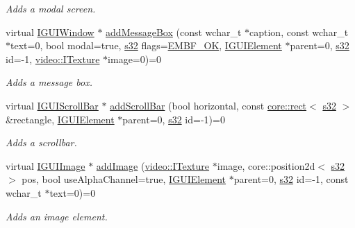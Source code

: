 \begin{DoxyCompactItemize}
\begin{DoxyCompactList}\small\item\em Adds a modal screen. \end{DoxyCompactList}\item 
virtual \hyperlink{classirr_1_1gui_1_1IGUIWindow}{I\+G\+U\+I\+Window} $\ast$ \hyperlink{classirr_1_1gui_1_1IGUIEnvironment_aaf8cad4624c26895523b22728098a917}{add\+Message\+Box} (const wchar\+\_\+t $\ast$caption, const wchar\+\_\+t $\ast$text=0, bool modal=true, \hyperlink{namespaceirr_ac66849b7a6ed16e30ebede579f9b47c6}{s32} flags=\hyperlink{namespaceirr_1_1gui_af55112e55731c9ad1b9fe9b372c521afa9660280349027f678b2315a15a23ba0e}{E\+M\+B\+F\+\_\+\+OK}, \hyperlink{classirr_1_1gui_1_1IGUIElement}{I\+G\+U\+I\+Element} $\ast$parent=0, \hyperlink{namespaceirr_ac66849b7a6ed16e30ebede579f9b47c6}{s32} id=-\/1, \hyperlink{classirr_1_1video_1_1ITexture}{video\+::\+I\+Texture} $\ast$image=0)=0
\begin{DoxyCompactList}\small\item\em Adds a message box. \end{DoxyCompactList}\item 
virtual \hyperlink{classirr_1_1gui_1_1IGUIScrollBar}{I\+G\+U\+I\+Scroll\+Bar} $\ast$ \hyperlink{classirr_1_1gui_1_1IGUIEnvironment_aff82c4b3935eaf56ce638996f5e002c9}{add\+Scroll\+Bar} (bool horizontal, const \hyperlink{classirr_1_1core_1_1rect}{core\+::rect}$<$ \hyperlink{namespaceirr_ac66849b7a6ed16e30ebede579f9b47c6}{s32} $>$ \&rectangle, \hyperlink{classirr_1_1gui_1_1IGUIElement}{I\+G\+U\+I\+Element} $\ast$parent=0, \hyperlink{namespaceirr_ac66849b7a6ed16e30ebede579f9b47c6}{s32} id=-\/1)=0
\begin{DoxyCompactList}\small\item\em Adds a scrollbar. \end{DoxyCompactList}\item 
virtual \hyperlink{classirr_1_1gui_1_1IGUIImage}{I\+G\+U\+I\+Image} $\ast$ \hyperlink{classirr_1_1gui_1_1IGUIEnvironment_a35cc257b3a183551a2ed0376dcec9fe4}{add\+Image} (\hyperlink{classirr_1_1video_1_1ITexture}{video\+::\+I\+Texture} $\ast$image, core\+::position2d$<$ \hyperlink{namespaceirr_ac66849b7a6ed16e30ebede579f9b47c6}{s32} $>$ pos, bool use\+Alpha\+Channel=true, \hyperlink{classirr_1_1gui_1_1IGUIElement}{I\+G\+U\+I\+Element} $\ast$parent=0, \hyperlink{namespaceirr_ac66849b7a6ed16e30ebede579f9b47c6}{s32} id=-\/1, const wchar\+\_\+t $\ast$text=0)=0
\begin{DoxyCompactList}\small\item\em Adds an image element. \end{DoxyCompactList}\item 

\end{DoxyCompactItemize}
